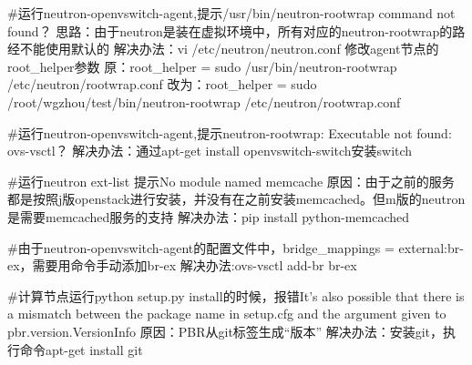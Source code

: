 \documentclass[a4paper,left=1.5cm,right=1.5cm,11pt]{article}
\begin{document}
\begin{itemize}
			#运行neutron-openvswitch-agent,提示/usr/bin/neutron-rootwrap command not found？
			思路：由于neutron是装在虚拟环境中，所有对应的neutron-rootwrap的路经不能使用默认的
			解决办法：vi /etc/neutron/neutron.conf 修改agent节点的root\_helper参数
			原：root\_helper = sudo /usr/bin/neutron-rootwrap /etc/neutron/rootwrap.conf
			改为：root\_helper = sudo /root/wgzhou/test/bin/neutron-rootwrap /etc/neutron/rootwrap.conf

			#运行neutron-openvswitch-agent,提示neutron-rootwrap: Executable not found: ovs-vsctl？
			解决办法：通过apt-get install openvswitch-switch安装switch

			#运行neutron ext-list 提示No module named memcache
			原因：由于之前的服务都是按照j版openstack进行安装，并没有在之前安装memcached。但m版的neutron是需要memcached服务的支持
			解决办法：pip install python-memcached

			#由于neutron-openvswitch-agent的配置文件中，bridge_mappings = external:br-ex，需要用命令手动添加br-ex
			解决办法:ovs-vsctl add-br br-ex

			#计算节点运行python setup.py install的时候，报错It's also possible that there is a mismatch between the package name in setup.cfg and the argument given to pbr.version.VersionInfo
		    原因：PBR从git标签生成“版本”
			解决办法：安装git，执行命令apt-get install git 
		
    \end{itemize}
\end{document}
